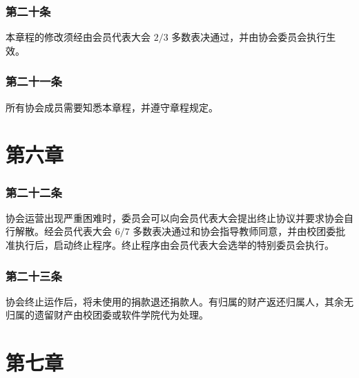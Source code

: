 \documentclass[
]{ctexart}
\begin{document}
\hypertarget{ux7b2cux4e8cux5341ux6761-ux534fux4f1aux7ae0ux7a0bux4feeux6539}{%
\subsubsection{第二十条}\label{ux7b2cux4e8cux5341ux6761-ux534fux4f1aux7ae0ux7a0bux4feeux6539}}

本章程的修改须经由会员代表大会 \(2/3\)
多数表决通过，并由协会委员会执行生效。

\hypertarget{ux7b2cux4e8cux5341ux6761-ux534fux4f1aux7ae0ux7a0bux4feeux6539a}{%
\subsubsection{第二十一条}\label{ux7b2cux4e8cux5341ux6761-ux534fux4f1aux7ae0ux7a0bux4feeux6539a}}

所有协会成员需要知悉本章程，并遵守章程规定。

\hypertarget{ux7b2cux516dux7ae0-ux7ec8ux6b62ux7a0bux5e8f}{%
\section{第六章}\label{ux7b2cux516dux7ae0-ux7ec8ux6b62ux7a0bux5e8f}}

\hypertarget{ux7b2cux4e8cux5341ux4e00ux6761-ux7ec8ux6b62ux6761ux4ef6}{%
\subsubsection{第二十二条}\label{ux7b2cux4e8cux5341ux4e00ux6761-ux7ec8ux6b62ux6761ux4ef6}}

协会运营出现严重困难时，委员会可以向会员代表大会提出终止协议并要求协会自行解散。经会员代表大会
\(6/7\)
多数表决通过和协会指导教师同意，并由校团委批准执行后，启动终止程序。终止程序由会员代表大会选举的特别委员会执行。

\hypertarget{ux7b2cux4e8cux5341ux4e8cux6761-ux7ec8ux6b62ux540eux8d22ux4ea7ux5904ux7406}{%
\subsubsection{第二十三条}\label{ux7b2cux4e8cux5341ux4e8cux6761-ux7ec8ux6b62ux540eux8d22ux4ea7ux5904ux7406}}

协会终止运作后，将未使用的捐款退还捐款人。有归属的财产返还归属人，其余无归属的遗留财产由校团委或软件学院代为处理。

\hypertarget{ux7b2cux4e03ux7ae0-ux9644ux5219}{%
\section{第七章}\label{ux7b2cux4e03ux7ae0-ux9644ux5219}}
\end{document}
